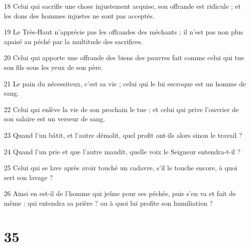 \par 18 Celui qui sacrifie une chose injustement acquise, son offrande est ridicule ; et les dons des hommes injustes ne sont pas acceptés.
\par 19 Le Très-Haut n'apprécie pas les offrandes des méchants ; il n'est pas non plus apaisé au péché par la multitude des sacrifices.
\par 20 Celui qui apporte une offrande des biens des pauvres fait comme celui qui tue son fils sous les yeux de son père.
\par 21 Le pain du nécessiteux, c'est sa vie ; celui qui le lui escroque est un homme de sang.
\par 22 Celui qui enlève la vie de son prochain le tue ; et celui qui prive l'ouvrier de son salaire est un verseur de sang.
\par 23 Quand l'un bâtit, et l'autre démolit, quel profit ont-ils alors sinon le travail ?
\par 24 Quand l'un prie et que l'autre maudit, quelle voix le Seigneur entendra-t-il ?
\par 25 Celui qui se lave après avoir touché un cadavre, s'il le touche encore, à quoi sert son lavage ?
\par 26 Ainsi en est-il de l'homme qui jeûne pour ses péchés, puis s'en va et fait de même : qui entendra sa prière ? ou à quoi lui profite son humiliation ?

\chapter{35}

